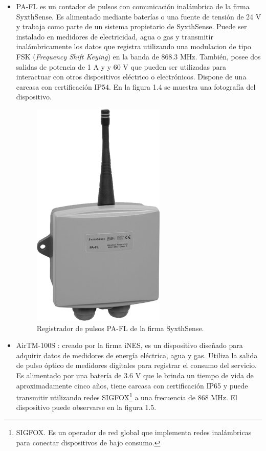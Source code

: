 \begin{itemize}
	\item PA-FL \citep{WEBSITE:6} es un contador de pulsos con comunicación inalámbrica de la firma SyxthSense. Es alimentado mediante baterías o una fuente de tensión de 24 V y trabaja como parte de un sistema propietario de SyxthSense. Puede ser instalado en medidores de electricidad, agua o gas y transmitir inalámbricamente los datos que registra utilizando una modulacion de tipo FSK (\textit{Frequency Shift Keying}) en la banda de 868.3 MHz. También, posee dos salidas de potencia de 1 A y y 60 V que pueden ser utilizadas para interactuar con otros dispositivos eléctrico o electrónicos. Dispone de una carcasa con certificación IP54. En la figura 1.4 se muestra una fotografía del dispositivo.
	
	\begin{figure}[h]
		\centering
		\includegraphics[scale=0.47]{./Figures/PA-FL.png}
		\caption{Registrador de pulsos PA-FL de la firma SyxthSense\protect\footnotemark.}
		\label{fig:cuadradoAzul}
	\end{figure}
	

	\item AirTM-100S \citep{WEBSITE:7}: creado por la firma iNES, es un dispositivo diseñado para adquirir datos de medidores de energía eléctrica, agua y gas. Utiliza la salida de pulso óptico de medidores digitales para registrar el consumo del servicio. Es alimentado por una batería de 3.6 V que le brinda un tiempo de vida de aproximadamente cinco años, tiene carcasa con certificación IP65 y puede transmitir utilizando redes SIGFOX\footnote{SIGFOX. Es un operador de red global que implementa redes inalámbricas para conectar dispositivos de bajo consumo.}  a una frecuencia de 868 MHz. El dispositivo puede observarse en la figura 1.5.
	

\end{itemize}
